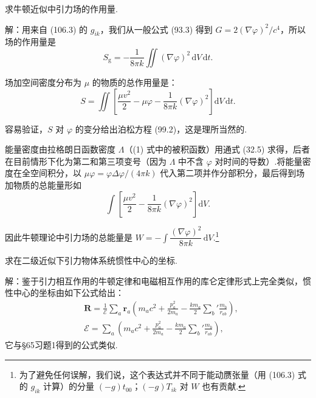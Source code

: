 \begin{xiti}

\quad 求牛顿近似中引力场的作用量.

解：用来自 (106.3) 的 $g_{ik}$，我们从一般公式 (93.3) 得到 $G=2(\nabla\varphi)^{2}/c^{4}$，所以场的作用量是
\begin{equation*}
  S_{\mathrm{g}}=-\frac{1}{8\pi k}\iint(\nabla\varphi)^{2}
  \,\mathrm{d}V\,\mathrm{d}t.
\end{equation*}

场加空间密度分布为 $\mu$ 的物质的总作用量是：
\begin{equation}
  S=\iint\left[\frac{\mu v^{2}}{2}-\mu\varphi
  -\frac{1}{8\pi k}(\nabla\varphi)^{2}\right]
  \mathrm{d}V\,\mathrm{d}t.
  \tag{1}
\end{equation}

容易验证，$S$ 对 $\varphi$ 的变分给出泊松方程 (99.2)，这是理所当然的.

能量密度由拉格朗日函数密度 $\varLambda$（(1) 式中的被积函数）用通式 (32.5) 求得，后者在目前情形下化为第二和第三项变号（因为 $\varLambda$ 中不含 $\varphi$ 对时间的导数）.将能量密度在全空间积分，以 $\mu\varphi=\varphi\Delta\varphi/(4\pi k)$ 代入第二项并作分部积分，最后得到场加物质的总能量形如
\begin{equation*}
  \int\left[\frac{\mu v^{2}}{2}
  -\frac{1}{8\pi k}(\nabla\varphi)^{2}\right]\mathrm{d}V.
\end{equation*}

因此牛顿理论中引力场的总能量是
$W=-\displaystyle\int\dfrac{(\nabla\varphi)^{2}}{8\pi k}\,\mathrm{d}V$.\footnote{为了避免任何误解，我们说，这个表达式并不同于能动赝张量（用 (106.3) 式的 $g_{ik}$ 计算）的分量 $(-g)t_{00}$；$(-g)T_{ik}$ 对 $W$ 也有贡献.}

\quad 求在二级近似下引力物体系统惯性中心的坐标.

解：鉴于引力相互作用的牛顿定律和电磁相互作用的库仑定律形式上完全类似，惯性中心的坐标由如下公式给出：
\begin{equation*}
\begin{aligned}
  &\boldsymbol{R}
  =\frac{1}{\mathcal{E}}\sum_a\boldsymbol{r}_a
  \left(m_ac^{2}+\frac{p_a^{2}}{2m_a}
  -\frac{km_a}{2}\sum_b'\frac{m_b}{r_{ab}}\right),\\
  &\mathcal{E}
  =\sum_a\left(m_ac^{2}+\frac{p_a^{2}}{2m_a}
  -\frac{km_a}{2}\sum_b'\frac{m_b}{r_{ab}}\right),
\end{aligned}
\end{equation*}
它与§65习题1得到的公式类似.


\end{xiti}
